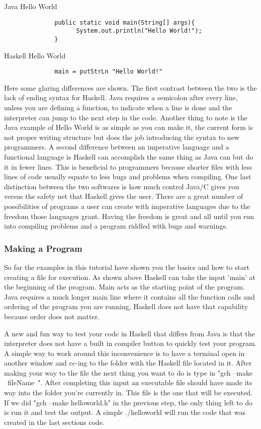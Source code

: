 \documentclass{article}
\begin{document}
    \medskip
    \caption{Java Hello World}
    \begin{lstlisting}
              public static void main(String[] args){
                    System.out.println("Hello World!");
              }
    \end{lstlisting}
    
    \medskip
    \caption{Haskell Hello World}
    \begin{lstlisting}
              main = putStrLn "Hello World!"
    \end{lstlisting}
    
    \medskip
    Here some glaring differences are shown. The first contrast between the two is the lack of ending syntax for Haskell. Java requires a semicolon after every line, unless you are defining a function, to indicate when a line is done and the interpreter can jump to the next step in the code. Another thing to note is the Java example of Hello World is as simple as you can make it, the current form is not proper writing structure but does the job introducing the syntax to new programmers. A second difference between an imperative language and a functional language is Haskell can accomplish the same thing as Java can but do it in fewer lines. This is beneficial to programmers because shorter files with less lines of code usually equate to less bugs and problems when compiling. One last distinction between the two softwares is how much control Java/C gives you versus the safety net that Haskell gives the user. There are a great number of possibilities of programs a user can create with imperative languages due to the freedom those languages grant. Having the freedom is great and all until you run into compiling problems and a program riddled with bugs and warnings. 
    
    \subsubsection{Making a Program}
    So far the examples in this tutorial have shown you the basics and how to start creating a file for execution. As shown above Haskell can take the input 'main' at the beginning of the program. Main acts as the starting point of the program. Java requires a much longer main line where it contains all the function calls and ordering of the program you are running, Haskell does not have that capability because order does not matter. 
    
    \medskip A new and fun way to test your code in Haskell that differs from Java is that the interpreter does not have a built in compiler button to quickly test your program. A simple way to work around this inconvenience is to have a terminal open in another window and cc-ing to the folder with the Haskell file located in it. After making your way to the file the next thing you want to do is type in "gch --make ~fileName~". After completing this input an executable file should have made its way into the folder you're currently in. This file is the one that will be executed. If we did "gch --make helloworld.h" in the previous step, the only thing left to do is run it and test the output. A simple ./helloworld will run the code that was created in the last sections code. 
    
\end{document}
